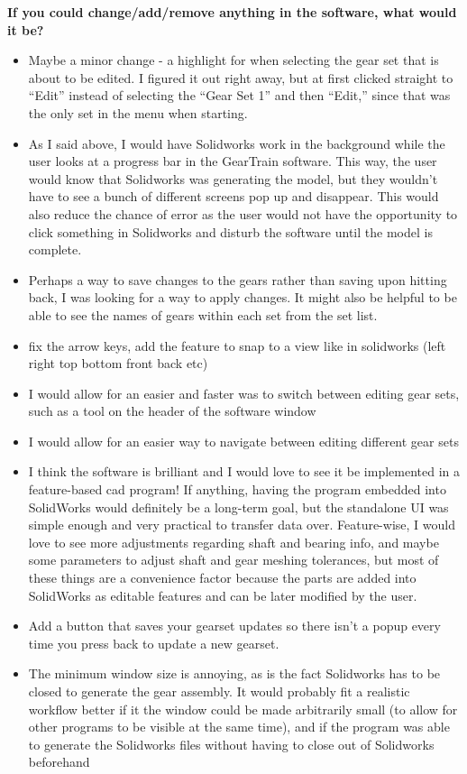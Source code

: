 \noindent\textbf{If you could change/add/remove anything in the software, what would it be?}
\begin{itemize}
    \item Maybe a minor change - a highlight for when selecting the gear set that is about to be edited. I figured it out right away, but at first clicked straight to ``Edit'' instead of selecting the ``Gear Set 1'' and then ``Edit,'' since that was the only set in the menu when starting.
    \item As I said above, I would have Solidworks work in the background while the user looks at a progress bar in the GearTrain software. This way, the user would know that Solidworks was generating the model, but they wouldn't have to see a bunch of different screens pop up and disappear. This would also reduce the chance of error as the user would not have the opportunity to click something in Solidworks and disturb the software until the model is complete.
    \item Perhaps a way to save changes to the gears rather than saving upon hitting back, I was looking for a way to apply changes. It might also be helpful to be able to see the names of gears within each set from the set list.
    \item fix the arrow keys, add the feature to snap to a view like in solidworks (left right top bottom front back etc)
    \item I would allow for an easier and faster was to switch between editing gear sets, such as a tool on the header of the software window
    \item I would allow for an easier way to navigate between editing different gear sets
    \item I think the software is brilliant and I would love to see it be implemented in a feature-based cad program! If anything, having the program embedded into SolidWorks would definitely be a long-term goal, but the standalone UI was simple enough and very practical to transfer data over. Feature-wise, I would love to see more adjustments regarding shaft and bearing info, and maybe some parameters to adjust shaft and gear meshing tolerances, but most of these things are a convenience factor because the parts are added into SolidWorks as editable features and can be later modified by the user.
    \item Add a button that saves your gearset updates so there isn't a popup every time you press back to update a new gearset.
    \item The minimum window size is annoying, as is the fact Solidworks has to be closed to generate the gear assembly. It would probably fit a realistic workflow better if it the window could be made arbitrarily small (to allow for other programs to be visible at the same time), and if the program was able to generate the Solidworks files without having to close out of Solidworks beforehand

\end{itemize}
